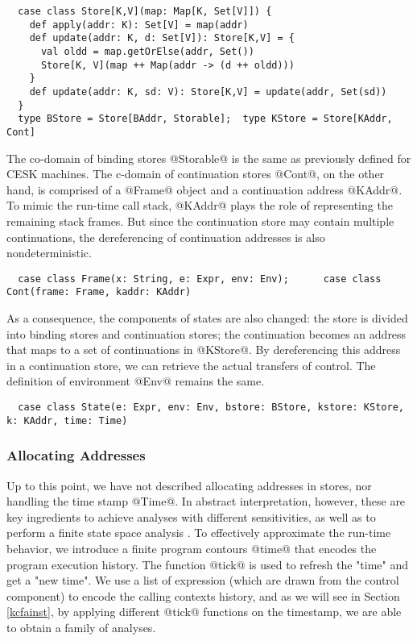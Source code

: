 \documentclass[acmsmall, review]{acmart}\settopmatter{}
\begin{document}
\begin{lstlisting}
  case class Store[K,V](map: Map[K, Set[V]]) {
    def apply(addr: K): Set[V] = map(addr)
    def update(addr: K, d: Set[V]): Store[K,V] = {
      val oldd = map.getOrElse(addr, Set())
      Store[K, V](map ++ Map(addr -> (d ++ oldd)))
    }
    def update(addr: K, sd: V): Store[K,V] = update(addr, Set(sd))
  }
  type BStore = Store[BAddr, Storable];  type KStore = Store[KAddr, Cont]
\end{lstlisting}

The co-domain of binding stores @Storable@ is the same as previously defined for CESK 
machines. The c-domain of continuation stores @Cont@, on the other hand, is comprised of
a @Frame@ object and a continuation address @KAddr@. To mimic the run-time call stack, 
@KAddr@ plays the role of representing the remaining stack frames.
But since the continuation store may contain multiple continuations, the dereferencing 
of continuation addresses is also nondeterministic.

\begin{lstlisting}
  case class Frame(x: String, e: Expr, env: Env);      case class Cont(frame: Frame, kaddr: KAddr)
\end{lstlisting}

As a consequence, the components of states are also changed: the store is divided
into binding stores and continuation stores; the continuation becomes an address
that maps to a set of continuations in @KStore@.
By dereferencing this address in a continuation store, we can retrieve the actual 
transfers of control. The definition of environment @Env@ remains the same.

\begin{lstlisting}
  case class State(e: Expr, env: Env, bstore: BStore, kstore: KStore, k: KAddr, time: Time)
\end{lstlisting}

\subsubsection{Allocating Addresses}
Up to this point, we have not described allocating addresses in stores, nor handling
the time stamp @Time@. In abstract interpretation, however, these are key ingredients
to achieve analyses with different sensitivities, as well as to perform a finite
state space analysis \cite{Gilray:2016:ACP:2951913.2951936}.
To effectively approximate the run-time behavior, we introduce a finite program contours
@time@ that encodes the program execution history. The function @tick@ is used to refresh
the "time" and get a "new time". We use a list of expression (which are drawn from the
control component) to encode the calling contexts history, and as we will see in Section~
\ref{kcfainst}, by applying different @tick@ functions on the timestamp, we are able to
obtain a family of analyses.
\end{document}

